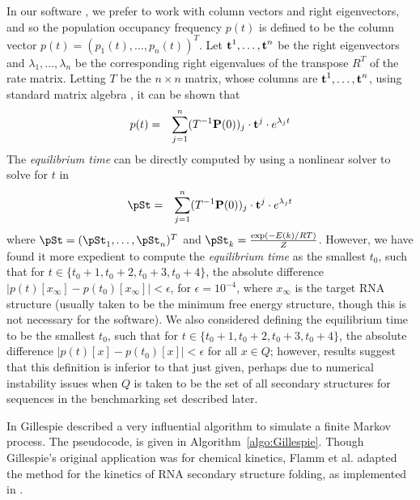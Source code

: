 In our software \hermes, we prefer to work with column vectors and
right eigenvectors, and so the population occupancy frequency
$p(t)$ is defined to be the column vector
$p(t)=(p_1(t),\ldots,p_n(t))^T$. Let
$\mbox{\bf t}^1,\ldots,\mbox{\bf t}^n$ be the right eigenvectors and
$\lambda_1,\ldots,\lambda_n$ be the corresponding right eigenvalues of the
transpose $R^T$ of the rate matrix.
Letting $T$ be the $n\times n$ matrix, whose columns are
$\mbox{\bf t}^1,\ldots,\mbox{\bf t}^n$, using standard matrix algebra
\citep{matrixTheory}, it can be shown that
\begin{align}
\label{eq:solutionMasterEquation}
p(t) &=& \sum_{j=1}^n (T^{-1}
\mbox{\bf P}(0))_j \cdot \mbox{\bf t}^j \cdot e^{\lambda_j t}
\end{align}
The {\em equilibrium time} can be directly computed by using a
nonlinear solver to solve for $t$ in
\begin{align}
\label{eq:solutionEquilibriumTime}
\pSt &=& \sum_{j=1}^n (T^{-1}
\mathbbP(0))_j \cdot \mathbbt^j \cdot e^{\lambda_j t}
\end{align}
where $\pSt= (\pSt_1,\ldots,\pSt_n)^T$ and $\pSt_k = \frac{\exp(-E(k)/RT)}{Z}$.
However, we have found it more
expedient to compute the {\em equilibrium time} as the smallest $t_0$,
such that for $t \in \{t_0+1,t_0+2,t_0+3,t_0+4\}$, the absolute difference
$|p(t)[x_{\infty}] - p(t_0)[x_{\infty}]| < \epsilon$, for $\epsilon =
10^{-4}$, where $x_{\infty}$ is the target RNA structure (usually taken
to be the minimum free energy structure, though this is not necessary for
the software). We also considered defining the equilibrium time to be the
smallest $t_0$, such that for $t \in \{t_0+1,t_0+2,t_0+3,t_0+4\}$, the
absolute difference $|p(t)[x] - p(t_0)[x]| < \epsilon$ for all $x \in
Q$; however, results suggest that this definition is inferior
to that just given, perhaps due to numerical instability issues when
$Q$ is taken to be the set of all secondary structures for sequences in
the benchmarking set described later.


In \citep{gillespieStochasticSimulation1} Gillespie described
a very influential algorithm to simulate a finite Markov process.
The pseudocode, is given in Algorithm~\ref{algo:Gillespie}.
Though Gillespie's original application was for chemical kinetics,
Flamm et al.  adapted the method for the kinetics of RNA secondary structure
folding, as implemented in \kinfold \citep{flammPhD,flamm}.


